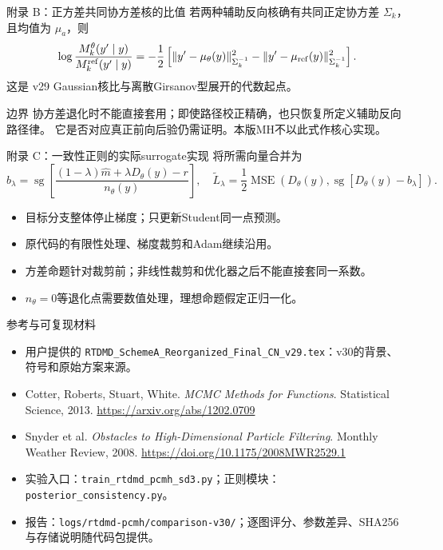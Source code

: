 \documentclass[10pt,aspectratio=169]{beamer}
\newcommand{\sg}{\operatorname{sg}}
\begin{document}
\begin{frame}{附录 B：正方差共同协方差核的比值}
\small
若两种辅助反向核确有共同正定协方差 $\Sigma_k$，且均值为 $\mu_a$，则
\begin{equation}
\log\frac{M_k^\theta(y'\mid y)}{M_k^{\rm ref}(y'\mid y)}
=-\frac12\left[\|y'-\mu_\theta(y)\|_{\Sigma_k^{-1}}^2
-\|y'-\mu_{\rm ref}(y)\|_{\Sigma_k^{-1}}^2\right].
\end{equation}
这是 v29 Gaussian核比与离散Girsanov型展开的代数起点。
\begin{alertblock}{边界}
协方差退化时不能直接套用；即使路径校正精确，也只恢复所定义辅助反向路径律。
它是否对应真正前向后验仍需证明。本版MH不以此式作核心实现。
\end{alertblock}
\end{frame}

\begin{frame}{附录 C：一致性正则的实际surrogate实现}
\small
将所需向量合并为
\begin{equation}
b_\lambda=\sg\!\left[
\frac{(1-\lambda)\widehat m+\lambda D_\theta(y)-r}{n_\theta(y)}\right],
\quad
\widetilde L_\lambda=\frac12\operatorname{MSE}\left(D_\theta(y),\sg[D_\theta(y)-b_\lambda]\right).
\end{equation}
\begin{itemize}\itemsep4pt
\item 目标分支整体停止梯度；只更新Student同一点预测。
\item 原代码的有限性处理、梯度裁剪和Adam继续沿用。
\item 方差命题针对裁剪前；非线性裁剪和优化器之后不能直接套同一系数。
\item $n_\theta=0$等退化点需要数值处理，理想命题假定正归一化。
\end{itemize}
\end{frame}

\begin{frame}{参考与可复现材料}
\footnotesize
\begin{itemize}\itemsep5pt
\item 用户提供的 \texttt{RTDMD\_SchemeA\_Reorganized\_Final\_CN\_v29.tex}：v30的背景、符号和原始方案来源。
\item Cotter, Roberts, Stuart, White. \emph{MCMC Methods for Functions}. Statistical Science, 2013.
\url{https://arxiv.org/abs/1202.0709}
\item Snyder et al. \emph{Obstacles to High-Dimensional Particle Filtering}. Monthly Weather Review, 2008.
\url{https://doi.org/10.1175/2008MWR2529.1}
\item 实验入口：\texttt{train\_rtdmd\_pcmh\_sd3.py}；正则模块：\texttt{posterior\_consistency.py}。
\item 报告：\texttt{logs/rtdmd-pcmh/comparison-v30/}；逐图评分、参数差异、SHA256与存储说明随代码包提供。
\end{itemize}
\end{frame}
\end{document}
